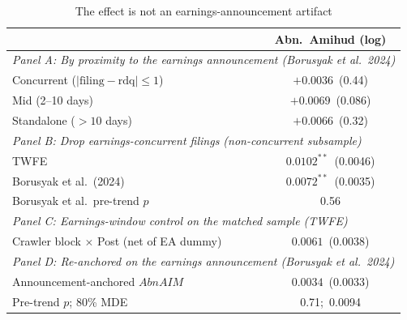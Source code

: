 \begin{table}[t]
\centering
\begin{threeparttable}
\caption{The effect is not an earnings-announcement artifact}
\label{tab:earnings}
\small
\begin{tabular}{lc}
\toprule
 & Abn.\ Amihud (log) \\
\midrule
\multicolumn{2}{l}{\textit{Panel A: By proximity to the earnings announcement (Borusyak et al.\ 2024)}}\\[2pt]
Concurrent ($|\text{filing}-\text{rdq}|\le 1$)   & $+0.0036$\ (0.44) \\
Mid (2--10 days)                                  & $+0.0069$\ (0.086) \\
Standalone ($>10$ days)                           & $+0.0066$\ (0.32) \\[4pt]
\multicolumn{2}{l}{\textit{Panel B: Drop earnings-concurrent filings (non-concurrent subsample)}}\\[2pt]
\quad TWFE                                        & $0.0102^{**}$\ (0.0046) \\
\quad Borusyak et al.\ (2024)                     & $0.0072^{**}$\ (0.0035) \\
\quad\quad Borusyak et al.\ pre-trend $p$         & 0.56 \\[4pt]
\multicolumn{2}{l}{\textit{Panel C: Earnings-window control on the matched sample (TWFE)}}\\[2pt]
Crawler block $\times$ Post (net of EA dummy)     & $0.0061$\ (0.0038) \\[4pt]
\multicolumn{2}{l}{\textit{Panel D: Re-anchored on the earnings announcement (Borusyak et al.\ 2024)}}\\[2pt]
Announcement-anchored $\mathit{AbnAIM}$           & $0.0034$\ (0.0033) \\
\quad Pre-trend $p$; 80\% MDE                     & 0.71;\ 0.0094 \\
\bottomrule
\end{tabular}
\begin{tablenotes}\footnotesize

\end{tablenotes}
\end{threeparttable}
\end{table}
